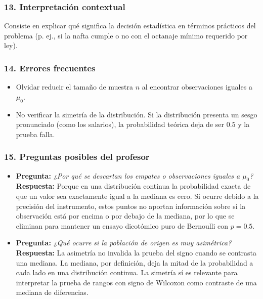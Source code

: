 \documentclass[11pt,a4paper]{article}
\begin{document}
\subsubsection{13. Interpretación contextual}
Consiste en explicar qué significa la decisión estadística en términos prácticos del problema (p. ej., si la nafta cumple o no con el octanaje mínimo requerido por ley).

\subsubsection{14. Errores frecuentes}
\begin{itemize}
    \item Olvidar reducir el tamaño de muestra $n$ al encontrar observaciones iguales a $\mu_0$.
    \item No verificar la simetría de la distribución. Si la distribución presenta un sesgo pronunciado (como los salarios), la probabilidad teórica deja de ser $0.5$ y la prueba falla.
\end{itemize}

\subsubsection{15. Preguntas posibles del profesor}
\begin{itemize}
    \item \textbf{Pregunta:} \textit{¿Por qué se descartan los empates o observaciones iguales a $\mu_0$?}
    \textbf{Respuesta:} Porque en una distribución continua la probabilidad exacta de que un valor sea exactamente igual a la mediana es cero. Si ocurre debido a la precisión del instrumento, estos puntos no aportan información sobre si la observación está por encima o por debajo de la mediana, por lo que se eliminan para mantener un ensayo dicotómico puro de Bernoulli con $p=0.5$.
    \item \textbf{Pregunta:} \textit{¿Qué ocurre si la población de origen es muy asimétrica?}
    \textbf{Respuesta:} La asimetría no invalida la prueba del signo cuando se contrasta una mediana. La mediana, por definición, deja la mitad de la probabilidad a cada lado en una distribución continua. La simetría sí es relevante para interpretar la prueba de rangos con signo de Wilcoxon como contraste de una mediana de diferencias.
\end{itemize}
\end{document}
